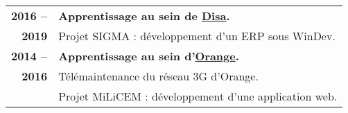 \begin{supertabular}{rl}
    \textbf{2016 --} & \textbf{Apprentissage au sein de \href{http://www.disa.fr}{Disa}.}\\
    \textbf{2019} & Projet SIGMA : d\'eveloppement d'un ERP sous WinDev.\\[1.5ex]
    \textbf{2014 --} & \textbf{Apprentissage au sein d'\href{https://www.orange.com/en/accueil}{Orange}.}\\
    \textbf{2016} & T\'el\'emaintenance du r\'eseau 3G d'Orange.\\
    & Projet MiLiCEM : d\'eveloppement d'une application web.\\
\end{supertabular}

\medskip
